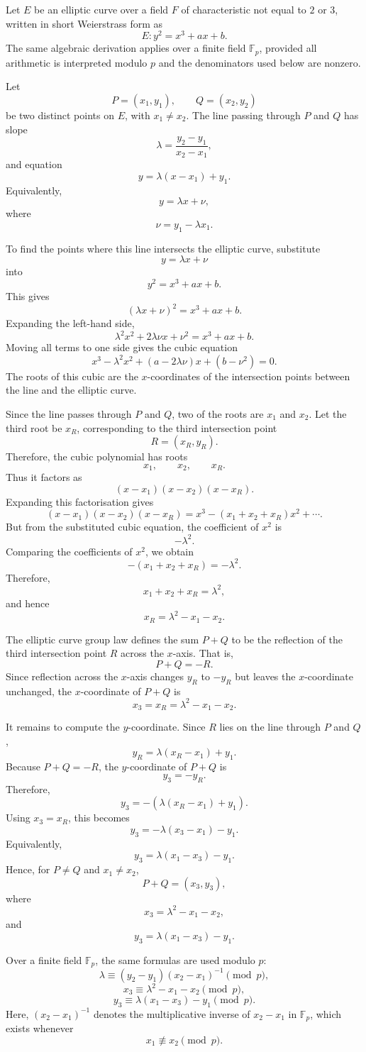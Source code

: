 \documentclass[12pt,a4paper]{article}
\begin{document}
Let \(E\) be an elliptic curve over a field \(F\) of characteristic not equal to \(2\) or \(3\), written in short Weierstrass form as
\[ E: y^2 = x^3 + ax + b. \]
The same algebraic derivation applies over a finite field \(\mathbb{F}_p\), provided all arithmetic is interpreted modulo \(p\) and the denominators used below are nonzero.

Let \[P=(x_1,y_1), \qquad Q=(x_2,y_2)\]
be two distinct points on \(E\), with \(x_1 \neq x_2\). The line passing through \(P\) and \(Q\) has slope
\[\lambda = \frac{y_2-y_1}{x_2-x_1},\]
and equation
\[y = \lambda(x-x_1)+y_1.\]
Equivalently,
\[y = \lambda x + \nu,\]
where
\[\nu = y_1-\lambda x_1.\]

To find the points where this line intersects the elliptic curve, substitute
\[y = \lambda x+\nu\]
into
\[y^2 = x^3 + ax + b.\]
This gives
\[(\lambda x+\nu)^2 = x^3 + ax + b.\]
Expanding the left-hand side,
\[\lambda^2x^2 + 2\lambda\nu x + \nu^2 = x^3 + ax + b.\]
Moving all terms to one side gives the cubic equation
\[x^3 - \lambda^2x^2 + (a-2\lambda\nu)x + (b-\nu^2)=0.\]
The roots of this cubic are the \(x\)-coordinates of the intersection points between the line and the elliptic curve.

Since the line passes through \(P\) and \(Q\), two of the roots are \(x_1\) and \(x_2\). Let the third root be \(x_R\), corresponding to the third intersection point
\[R=(x_R,y_R).\]
Therefore, the cubic polynomial has roots
\[x_1, \qquad x_2, \qquad x_R.\]
Thus it factors as
\[(x-x_1)(x-x_2)(x-x_R).\]
Expanding this factorisation gives
\[(x-x_1)(x-x_2)(x-x_R)=x^3-(x_1+x_2+x_R)x^2+\cdots.\]
But from the substituted cubic equation, the coefficient of \(x^2\) is
\[-\lambda^2.\]
Comparing the coefficients of \(x^2\), we obtain
\[-(x_1+x_2+x_R)=-\lambda^2.\]
Therefore,
\[x_1+x_2+x_R=\lambda^2,\]
and hence
\[x_R=\lambda^2-x_1-x_2.\]

The elliptic curve group law defines the sum \(P+Q\) to be the reflection of the third intersection point \(R\) across the \(x\)-axis. That is,
\[P+Q=-R.\]
Since reflection across the \(x\)-axis changes \(y_R\) to \(-y_R\) but leaves the \(x\)-coordinate unchanged, the \(x\)-coordinate of \(P+Q\) is
\[x_3=x_R=\lambda^2-x_1-x_2.\]

It remains to compute the \(y\)-coordinate. Since \(R\) lies on the line through \(P\) and \(Q\),
\[y_R=\lambda(x_R-x_1)+y_1.\]
Because \(P+Q=-R\), the \(y\)-coordinate of \(P+Q\) is
\[y_3=-y_R.\]
Therefore,
\[y_3=-\left(\lambda(x_R-x_1)+y_1\right).\]
Using \(x_3=x_R\), this becomes
\[y_3=-\lambda(x_3-x_1)-y_1.\]
Equivalently,
\[y_3=\lambda(x_1-x_3)-y_1.\]
Hence, for \(P\neq Q\) and \(x_1\neq x_2\),
\[P+Q=(x_3,y_3),\]
where
\[x_3=\lambda^2-x_1-x_2,\]
and
\[y_3=\lambda(x_1-x_3)-y_1.\]

Over a finite field \(\mathbb{F}_p\), the same formulas are used modulo \(p\):
\[\lambda\equiv (y_2-y_1)(x_2-x_1)^{-1}\pmod p,\]
\[x_3\equiv \lambda^2-x_1-x_2\pmod p,\]
\[y_3\equiv \lambda(x_1-x_3)-y_1\pmod p.\]
Here, \((x_2-x_1)^{-1}\) denotes the multiplicative inverse of \(x_2-x_1\) in \(\mathbb{F}_p\), which exists whenever
\[x_1 \not\equiv x_2 \pmod p.\]
\end{document}
